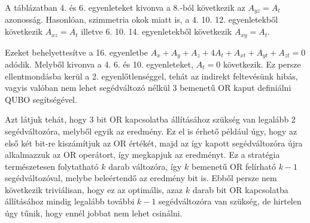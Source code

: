 A táblázatban 4. és 6. egyenleteket kivonva a 8.-ból következik az $A_{yz}=A_{t}$ azonosság. Hasonlóan, szimmetria okok miatt is, a 4. 10. 12. egyenletekből következik $A_{xz}=A_{t}$ illetve 6. 10. 14. egyenletekből következik $A_{xy}=A_{t}$.

Ezeket behelyettesítve a 16. egyenletbe $A_{x}+A_{y}+A_{z}+4A_{t}+A_{xt}+A_{yt}+A_{zt}=0$ adódik. Melyből kivonva a 4. 6. és 10. egyenleteket, $A_{t}=0$ következik. Ez persze ellentmondásba kerül a 2. egyenlőtlenséggel, tehát az indirekt feltevésünk hibás, vagyis valóban nem lehet segédváltozó nélkül 3 bemenetű OR kaput definiálni QUBO segítségével.

Azt látjuk tehát, hogy 3 bit OR kapcsolatba állításához szükség van legalább 2 segédváltozóra, melyből egyik az eredmény. Ez el is érhető például úgy, hogy az első két bit-re kiszámítjuk az OR értékét, majd az így kapott segédváltozóra újra alkalmazzuk az OR operátort, így megkapjuk az eredményt. Ez a stratégia természetesen folytatható $k$ darab változóra, így $k$ bemenetű OR felírható $k-1$ segédváltozóval, melybe beleértendő az eredmény bit is. Ebből persze nem következik triviálisan, hogy ez az optimális, azaz $k$ darab bit OR kapcsolatba állításához mindig legalább további $k-1$ segédváltozóra van szükség, de hirtelen úgy tűnik, hogy ennél jobbat nem lehet csinálni.
